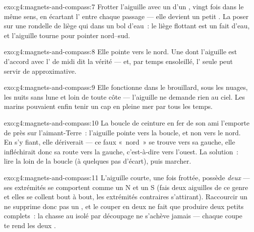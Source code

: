 \begin{solution}{exo:g4:magnets-and-compass:7}
Frotter l'aiguille avec un  d'un , vingt fois dans le même
sens, en écartant l' entre chaque passage --- elle devient un
petit . La poser sur une rondelle de liège qui  dans un
bol d'eau~: le liège flottant est un  fait d'eau, et l'aiguille
tourne pour pointer nord--sud.
\end{solution}

\begin{solution}{exo:g4:magnets-and-compass:8}
Elle pointe vers le nord. Une  dont l'aiguille est d'accord
avec l' de midi dit la vérité --- et, par temps ensoleillé,
l' seule peut servir de  approximative.
\end{solution}

\begin{solution}{exo:g4:magnets-and-compass:9}
Elle fonctionne dans le brouillard, sous les nuages, les nuits sans
lune et loin de toute côte --- l'aiguille ne demande rien au ciel.
Les marins pouvaient enfin tenir un cap en pleine mer par tous les
temps.
\end{solution}

\begin{solution}{exo:g4:magnets-and-compass:10}
La boucle de ceinture en fer de son ami l'emporte de près sur
l'aimant-Terre~: l'aiguille pointe vers la boucle, et non vers le
nord. En s'y fiant, elle dériverait --- ce faux «~nord~» se trouve
vers sa gauche, elle infléchirait donc sa route vers la gauche,
c'est-à-dire vers l'ouest. La solution~: lire la  loin de la
boucle (à quelques pas d'écart), puis marcher.
\end{solution}

\begin{solution}{exo:g4:magnets-and-compass:11}
L'aiguille courte, une fois frottée, possède \emph{deux}  ---
ses extrémités se comportent comme un N et un S (fais  deux
aiguilles de ce genre et elles se collent bout à bout, les
extrémités contraires s'attirant). Raccourcir un  ne supprime
donc pas un , et le couper en deux ne fait que produire deux
petits  complets~: la chasse au  isolé par découpage ne
s'achève jamais --- chaque coupe te rend les deux .
\end{solution}
